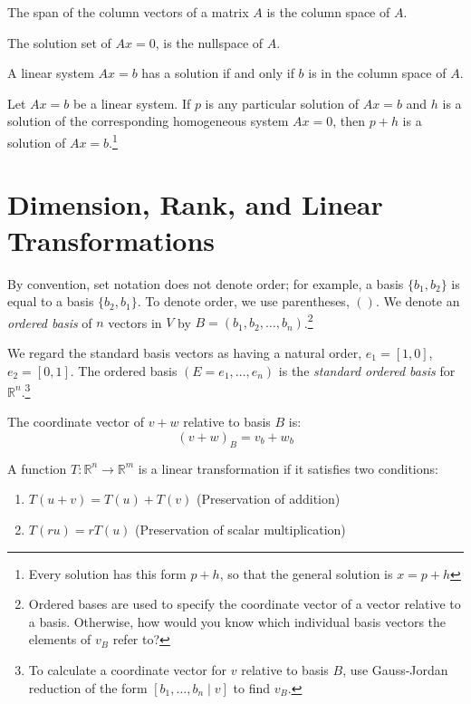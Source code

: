\documentclass[nobib,notoc]{tufte-handout}
\begin{document}
\begin{defi}
	The span of the column vectors of a matrix \(A\) is the column space of \(A\).
\end{defi}
\begin{defi}[Nullspace]
	The solution set of \(Ax=0\), is the nullspace of \(A\).
\end{defi}
\begin{thm}
	A linear system \(Ax=b\) has a solution if and only if \(b\) is in the column space of \(A\).
\end{thm}
\begin{thm}
	Let \(Ax=b\) be a linear system. If \(p\) is any particular solution of \(Ax=b\) and \(h\) is a solution of the corresponding homogeneous system \(Ax=0\), then \(p+h\) is a solution of \(Ax=b\).\footnote{Every solution has this form \(p+h\), so that the general solution is \(x=p+h\)}
\end{thm}
\section{Dimension, Rank, and Linear Transformations}
\begin{defi}
	By convention, set notation does not denote order; for example, a basis \(\{b_1,b_2\}\) is equal to a basis \(\{b_2,b_1\}\). To denote order, we use parentheses, \(()\). We denote an \emph{ordered basis} of \(n\) vectors in \(V\) by \(B=(b_1,b_2,\ldots,b_n)\).\footnote{Ordered bases are used to specify the coordinate vector of a vector relative to a basis. Otherwise, how would you know which individual basis vectors the elements of \(v_{B}\) refer to?}
\end{defi}
\begin{defi}
	We regard the standard basis vectors as having a natural order, \(e_1=[1,0]\), \(e_2=[0,1]\). The ordered basis \((E=e_1,\ldots,e_n)\) is the \emph{standard ordered basis} for \(\mathbb{R}^n\).\footnote{To calculate a coordinate vector for \(v\) relative to basis \(B\), use Gauss-Jordan reduction of the form \([b_1,\ldots,b_n\mid v]\) to find \(v_B\).}
\end{defi}
\begin{cor}
	The coordinate vector of \(v+w\) relative to basis \(B\) is:
	\begin{equation*}
		(v+w)_B=v_b+w_b
	\end{equation*}
\end{cor}
\begin{defi}
	A function \(T:\mathbb{R}^n\rightarrow \mathbb{R}^m\) is a linear transformation if it satisfies two conditions:
	\begin{enumerate}
		\item\(T(u+v)=T(u)+T(v)\) (Preservation of addition)
		\item\(T(ru)=rT(u)\) (Preservation of scalar multiplication)
	\end{enumerate}
\end{defi}
\end{document}
